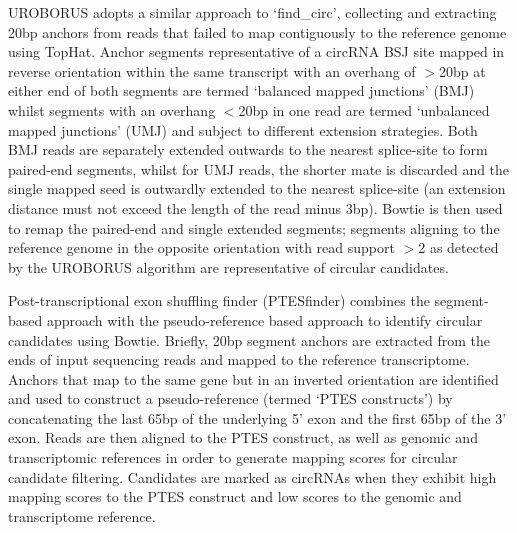 UROBORUS \cite{UROBORUS} adopts a similar approach to `find\_circ', collecting and extracting 20bp anchors from reads that failed to map contiguously to the reference genome using TopHat. Anchor segments representative of a circRNA BSJ site mapped in reverse orientation within the same transcript with an overhang of $>$20bp at either end of both segments are termed `balanced mapped junctions' (BMJ) whilst segments with an overhang $<$20bp in one read are termed `unbalanced mapped junctions' (UMJ) and subject to different extension strategies. Both BMJ reads are separately extended outwards to the nearest splice-site to form paired-end segments, whilst for UMJ reads, the shorter mate is discarded and the single mapped seed is outwardly extended to the nearest splice-site (an extension distance must not exceed the length of the read minus 3bp). Bowtie is then used to remap the paired-end and single extended segments; segments aligning to the reference genome in the opposite orientation with read support $>$2 as detected by the UROBORUS algorithm are representative of circular candidates. \par
Post-transcriptional exon shuffling finder (PTESfinder) \cite{PTESfinder} combines the segment-based approach with the pseudo-reference based approach to identify circular candidates using Bowtie. Briefly, 20bp segment anchors are extracted from the ends of input sequencing reads and mapped to the reference transcriptome. Anchors that map to the same gene but in an inverted orientation are identified and used to construct a pseudo-reference (termed `PTES constructs') by concatenating the last 65bp of the underlying 5' exon and the first 65bp of the 3' exon. Reads are then aligned to the PTES construct, as well as genomic and transcriptomic references in order to generate mapping scores for circular candidate filtering. Candidates are marked as circRNAs when they exhibit high mapping scores to the PTES construct and low scores to the genomic and transcriptome reference. \par 
